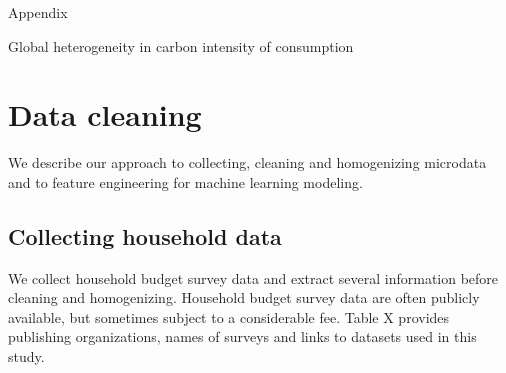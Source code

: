 \documentclass[12pt, a4paper]{article}
\begin{document}
\clearpage

\printbibliography

\clearpage

\appendix 
{\Huge Appendix} \label{sec:appendix}

Global heterogeneity in carbon intensity of consumption

\clearpage
\section{Data cleaning} \label{sec:cleaning}

We describe our approach to collecting, cleaning and homogenizing microdata and to feature engineering for machine learning modeling.

\subsection{Collecting household data}

We collect household budget survey data and extract several information before cleaning and homogenizing. Household budget survey data are often publicly available, but sometimes subject to a considerable fee. Table X provides publishing organizations, names of surveys and links to datasets used in this study.
\end{document}
